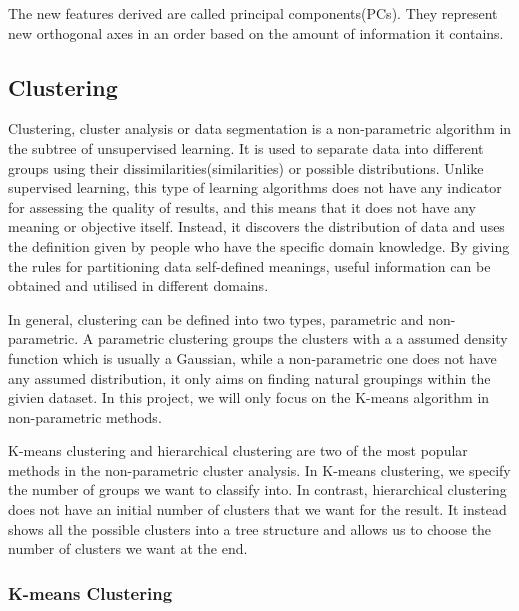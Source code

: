 \documentclass[11pt]{article} %
\theoremstyle{plain}
\theoremstyle{definition}
\begin{document}
The new features derived are called principal components(PCs). They represent new orthogonal axes in an order based on the amount of information it contains. 



\subsection{Clustering}

Clustering, cluster analysis or data segmentation is a non-parametric algorithm in the subtree of unsupervised learning. It is used to separate data into different groups using their dissimilarities(similarities) or possible distributions. Unlike supervised learning, this type of learning algorithms does not have any indicator for assessing the quality of results, and this means that it does not have any meaning or objective itself. Instead, it discovers the distribution of data and uses the definition given by people who have the specific domain knowledge. By giving the rules for partitioning data self-defined meanings, useful information can be obtained and utilised in different domains\cite{hastie/etal:2009}.

In general, clustering can be defined into two types, parametric and non-parametric. A parametric clustering groups the clusters with a a assumed density function which is usually a Gaussian, while a non-parametric one does not have any assumed distribution, it only aims on finding natural groupings within the givien dataset. In this project, we will only focus on the K-means algorithm in non-parametric methods.

K-means clustering and hierarchical clustering are two of the most popular methods in the non-parametric cluster analysis. In K-means clustering, we specify the number of groups we want to classify into. In contrast, hierarchical clustering does not have an initial number of clusters that we want for the result. It instead shows all the possible clusters into a tree structure and allows us to choose the number of clusters we want at the end.

\subsubsection{K-means Clustering}
\end{document}
